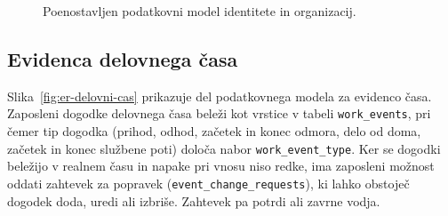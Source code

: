 \begin{figure}[htbp]
\centering
{}
\caption{Poenostavljen podatkovni model identitete in organizacij.}
\label{fig:er-identiteta}
\end{figure}
\FloatBarrier

\subsection{Evidenca delovnega časa}

Slika~\ref{fig:er-delovni-cas} prikazuje del podatkovnega modela za evidenco časa. Zaposleni dogodke delovnega časa beleži kot vrstice v tabeli \texttt{work\_events}, pri čemer tip dogodka (prihod, odhod, začetek in konec odmora, delo od doma, začetek in konec službene poti) določa nabor \texttt{work\_event\_type}. Ker se dogodki beležijo v realnem času in napake pri vnosu niso redke, ima zaposleni možnost oddati zahtevek za popravek (\texttt{event\_change\_requests}), ki lahko obstoječ dogodek doda, uredi ali izbriše. Zahtevek pa potrdi ali zavrne vodja.

